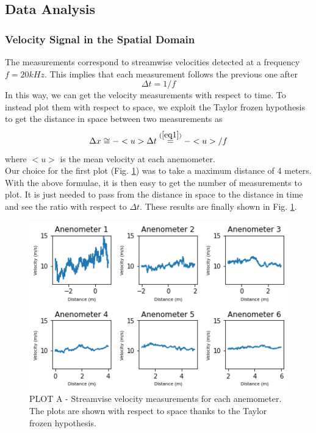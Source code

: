 \documentclass[11pt,titlepage]{article}
\begin{document}
\subsection{Data Analysis}

\subsubsection{Velocity Signal in the Spatial Domain}\label{velocity_signal_in_the_spatial_domain}
The measurements correspond to streamwise velocities detected at a frequency $f=20kHz$. This implies that each measurement follows the previous one after 
\begin{equation} \label{eq1}
\Delta t = 1/f
\end{equation}
In this way, we can get the velocity measurements with respect to time. To instead plot them with respect to space, we exploit the Taylor frozen hypothesis to get the distance in space between two measurements as 
\begin{equation} \label{eq2}
	\Delta x \cong - <u> \Delta t \overset{(\ref{eq1})}{=} -<u>/f
\end{equation}
	where $<u>$ is the mean velocity at each anemometer. \\ 
Our choice for the first plot (Fig. \ref{fig1}) was to take a maximum distance of 4 meters. With the above formulae, it is then easy to get the number of measurements to plot. It is just needed to pass from the distance in space to the distance in time and see the ratio with respect to $\Delta t$. These results are finally shown in Fig. \ref{fig1}. \\

	\begin{center}
	\begin{figure} [h]
		\centering
		\includegraphics[width = 4.5in]{./figures/ex1_1.png}
		\caption{PLOT A - Streamvise velocity measurements for each anemometer. The plots are shown with respect to space thanks to the Taylor frozen hypothesis.}
		\label{fig1}
	\end{figure}
\end{center}
\end{document}
